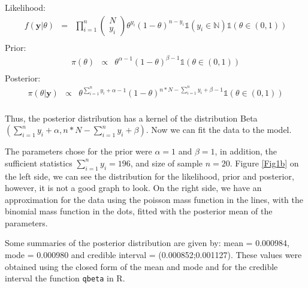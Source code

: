 \documentclass[a4paper, 11pt]{article}
\begin{document}
\noindent
Likelihood:
\begin{equation*}
\begin{array}{lclll}
f(\textbf{y}|\theta) & = & \displaystyle\prod_{i=1}^{n} \left(
    \begin{array}{c}
     N \\
     y_i  
    \end{array}
        \right) \theta^{y_i} (1 - \theta)^{n - y_i} \mathds{1} \left(y_i \in \mathds{N}\right) \mathds{1} \left(\theta \in (0,1)\right)\\
\end{array}
\end{equation*}
Prior:
\begin{equation*}
\begin{array}{lclll}
\pi(\theta) & \propto & \theta^{\alpha -1} (1 - \theta)^{\beta -1} \mathds{1} \left(\theta \in (0,1)\right) \\
\end{array}
\end{equation*}
Posterior:
\begin{equation*}
\begin{array}{lclll}
\pi(\theta|\textbf{y}) & \propto &  \theta^{\sum_{i=1}^{n}y_i + \alpha -1} (1 - \theta)^{n*N - \sum_{i=1}^{n}y_i + \beta -1} \mathds{1} \left(\theta \in (0,1)\right) \\
\end{array}
\end{equation*}

Thus, the posterior distribution has a kernel of the distribution Beta $(\sum_{i=1}^{n}y_i + \alpha,n*N - \sum_{i=1}^{n}y_i + \beta)$. Now we can fit the data to the model.

The parameters chose for the prior were $\alpha=1$ and $\beta=1$, in addition, the sufficient statistics $\sum_{i=1}^{n}y_i = 196$, and size of sample $n=20$. Figure \ref{Fig1b} on the left side, we can see the distribution for the likelihood, prior and posterior, however, it is not a good graph to look. On the right side, we have an approximation for the data using the poisson mass function in the lines, with the binomial mass function in the dots, fitted with the posterior mean of the parameters. 

Some summaries of the posterior distribution are given by: mean = 0.000984, mode = 0.000980 and credible interval = (0.000852;0.001127). These values were obtained using the closed form of the mean and mode and for the credible interval the function \texttt{qbeta} in R.\\
\end{document}
